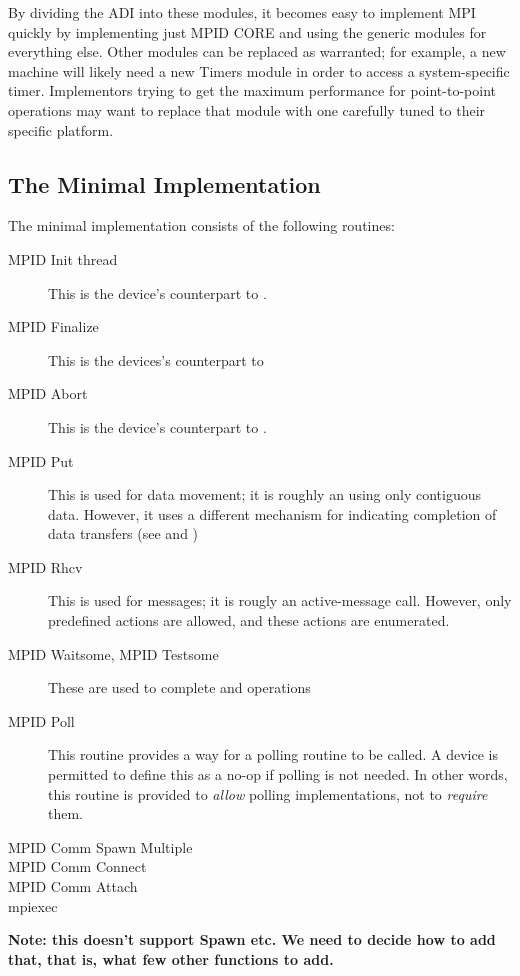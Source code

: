 \documentclass{article}
\begin{document}
By dividing the ADI into these modules, it becomes easy to implement
MPI quickly by implementing just MPID CORE and using the generic
modules for everything else.  Other modules can be replaced as
warranted; for example, a new machine will likely need a new Timers
module in order to access a system-specific timer.  Implementors
trying to get the maximum performance for point-to-point operations
may want to replace that module with one carefully tuned to their
specific platform.

\subsection{The Minimal Implementation}
\label{sec-minimal}

The minimal implementation consists of the following routines:

\begin{description}
\item[MPID Init thread]This is the device's counterpart to
. 
\item[MPID Finalize]This is the devices's counterpart to
\item[MPID Abort]This is the device's counterpart to .
\item[MPID Put]This is used for data movement; it is roughly an
 using only contiguous data.  However, it uses a
different mechanism for indicating completion of data transfers (see  and )
\item[MPID Rhcv]This is used for messages; it is rougly an
active-message call.  However, only predefined actions are allowed,
and these actions are enumerated.
\item[MPID Waitsome, MPID Testsome]These are used to complete 
and  operations
\item[MPID Poll]This routine provides a way for a polling routine to
be called.  A device is permitted to define this as a no-op if polling
is not needed.  In other words, this routine is provided to
\emph{allow} polling implementations, not to \emph{require} them.
\item[MPID Comm Spawn Multiple]
\item[MPID Comm Connect]
\item[MPID Comm Attach]
\item[mpiexec]
\end{description}

\textbf{Note: this doesn't support Spawn etc. We need to decide how to
add that, that is, what few other functions to add.}
\end{document}

